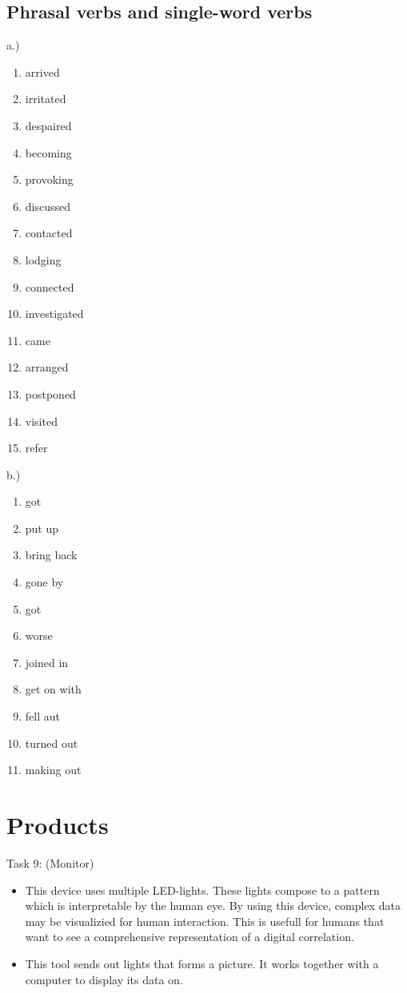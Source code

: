 \subsection{Phrasal verbs and single-word verbs}
a.)
\begin{enumerate}
\item arrived
\item irritated
\item despaired
\item becoming
\item provoking
\item discussed
\item contacted
\item lodging
\item connected
\item investigated
\item came
\item arranged
\item postponed
\item visited
\item refer
\end{enumerate}
b.)
\begin{enumerate}
\item got
\item put up
\item bring back
\item gone by
\item got
\item worse
\item joined in
\item get on with
\item fell aut
\item turned out
\item making out
\end{enumerate}

\section{Products}

Task 9: (Monitor)
\begin{itemize}
\item This device uses multiple LED-lights. These lights compose to a pattern which is interpretable by the human eye. By using this device, complex data may be visualizied for human interaction. This is usefull for humans that want to see a comprehensive representation of a digital correlation.
\item This tool sends out lights that forms a picture. It works together with a computer to display its data on.
\end{itemize}


